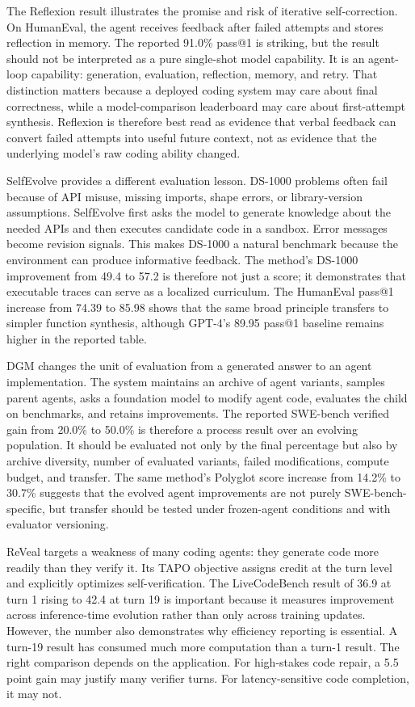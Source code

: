 The Reflexion result illustrates the promise and risk of iterative self-correction. On HumanEval, the agent receives feedback after failed attempts and stores reflection in memory. The reported 91.0\% pass@1 is striking, but the result should not be interpreted as a pure single-shot model capability. It is an agent-loop capability: generation, evaluation, reflection, memory, and retry. That distinction matters because a deployed coding system may care about final correctness, while a model-comparison leaderboard may care about first-attempt synthesis. Reflexion is therefore best read as evidence that verbal feedback can convert failed attempts into useful future context, not as evidence that the underlying model's raw coding ability changed.

SelfEvolve provides a different evaluation lesson. DS-1000 problems often fail because of API misuse, missing imports, shape errors, or library-version assumptions. SelfEvolve first asks the model to generate knowledge about the needed APIs and then executes candidate code in a sandbox. Error messages become revision signals. This makes DS-1000 a natural benchmark because the environment can produce informative feedback. The method's DS-1000 improvement from 49.4 to 57.2 is therefore not just a score; it demonstrates that executable traces can serve as a localized curriculum. The HumanEval pass@1 increase from 74.39 to 85.98 shows that the same broad principle transfers to simpler function synthesis, although GPT-4's 89.95 pass@1 baseline remains higher in the reported table.

DGM changes the unit of evaluation from a generated answer to an agent implementation. The system maintains an archive of agent variants, samples parent agents, asks a foundation model to modify agent code, evaluates the child on benchmarks, and retains improvements. The reported SWE-bench verified gain from 20.0\% to 50.0\% is therefore a process result over an evolving population. It should be evaluated not only by the final percentage but also by archive diversity, number of evaluated variants, failed modifications, compute budget, and transfer. The same method's Polyglot score increase from 14.2\% to 30.7\% suggests that the evolved agent improvements are not purely SWE-bench-specific, but transfer should be tested under frozen-agent conditions and with evaluator versioning.

ReVeal targets a weakness of many coding agents: they generate code more readily than they verify it. Its TAPO objective assigns credit at the turn level and explicitly optimizes self-verification. The LiveCodeBench result of 36.9 at turn 1 rising to 42.4 at turn 19 is important because it measures improvement across inference-time evolution rather than only across training updates. However, the number also demonstrates why efficiency reporting is essential. A turn-19 result has consumed much more computation than a turn-1 result. The right comparison depends on the application. For high-stakes code repair, a 5.5 point gain may justify many verifier turns. For latency-sensitive code completion, it may not.

